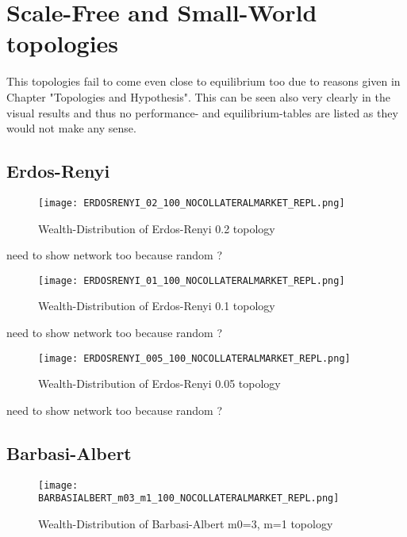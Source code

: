\documentclass[Bachelorarbeit.tex]{subfiles}
\begin{document}
\section{Scale-Free and Small-World topologies}
This topologies fail to come even close to equilibrium too due to reasons given in Chapter "Topologies and Hypothesis". This can be seen also very clearly in the visual results and thus no performance- and equilibrium-tables are listed as they would not make any sense.

\subsection{Erdos-Renyi}
\begin{figure}[H]
	\centering
  \texttt{[image: ERDOSRENYI\_02\_100\_NOCOLLATERALMARKET\_REPL.png]}
	\caption{Wealth-Distribution of Erdos-Renyi 0.2 topology}
	\label{fig:wealth_ERDOSRENYI_02_100_NOCOLLATERALMARKET_REPL}
\end{figure}

need to show network too because random ?

\begin{figure}[H]
	\centering
  \texttt{[image: ERDOSRENYI\_01\_100\_NOCOLLATERALMARKET\_REPL.png]}
	\caption{Wealth-Distribution of Erdos-Renyi 0.1 topology}
	\label{fig:wealth_ERDOSRENYI_01_100_NOCOLLATERALMARKET_REPL}
\end{figure}

need to show network too because random ?

\begin{figure}[H]
	\centering
  \texttt{[image: ERDOSRENYI\_005\_100\_NOCOLLATERALMARKET\_REPL.png]}
	\caption{Wealth-Distribution of Erdos-Renyi 0.05 topology}
	\label{fig:wealth_ERDOSRENYI_005_100_NOCOLLATERALMARKET_REPL}
\end{figure}

need to show network too because random ?

\subsection{Barbasi-Albert}
\begin{figure}[H]
	\centering
  \texttt{[image: BARBASIALBERT\_m03\_m1\_100\_NOCOLLATERALMARKET\_REPL.png]}
	\caption{Wealth-Distribution of Barbasi-Albert m0=3, m=1 topology}
	\label{fig:wealth_BARBASIALBERT_m03_m1_100_NOCOLLATERALMARKET_REPL}
\end{figure}
\end{document}
